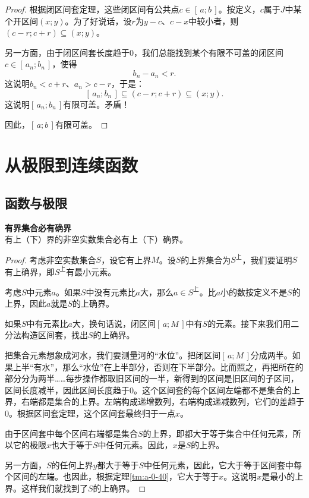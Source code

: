 \documentclass[12pt,UTF8]{ctexbook}
\begin{document}
\begin{appendix}
\begin{proof}
    根据闭区间套定理，这些闭区间有公共点$c\in[\,a; b\,]$。按定义，$c$属于$J$中某个开区间$(x; y)$。为了好说话，设$r$为$y-c$、$c-x$中较小者，则$(c-r; c+r)\subseteq (x; y)$。

    另一方面，由于闭区间套长度趋于$0$，我们总能找到某个有限不可盖的闭区间$c\in [\,a_n; b_n\,]$，使得
    $$ b_n - a_n < r.$$
    这说明$b_n < c+r$、$a_n>c-r$，于是：
    $$[\,a_n; b_n\,] \subseteq (c-r; c+r) \subseteq (x; y). $$
    这说明$[\,a_n; b_n\,]$有限可盖。矛盾！

    因此，$[\,a; b\,]$有限可盖。

\end{proof}

\chapter{从极限到连续函数}
\section{函数与极限}
\begin{tm}{\textbf{有界集合必有确界}}\label{tm:b-0-0}\\
    有上（下）界的非空实数集合必有上（下）确界。
\end{tm}
\begin{proof}
    考虑非空实数集合$S$，设它有上界$M$。设$S$的上界集合为$S^{\text{上}}$，我们要证明$S$有上确界，即$S^{\text{上}}$有最小元素。

    考虑$S$中元素$a$。如果$S$中没有元素比$a$大，那么$a\in S^{\text{上}}$。比$a$小的数按定义不是$S$的上界，因此$a$就是$S$的上确界。

    如果$S$中有元素比$a$大，换句话说，闭区间$[\,a; M\,]$中有$S$的元素。接下来我们用二分法构造区间套，找出$S$的上确界。

    把集合元素想象成河水，我们要测量河的“水位”。把闭区间$[\,a; M\,]$分成两半。如果上半“有水”，那么“水位”在上半部分，否则在下半部分。比而照之，再把所在的部分分为两半……每步操作都取旧区间的一半，新得到的区间是旧区间的子区间，区间长度减半，因此区间长度趋于$0$。这个区间套的每个区间左端都不是集合的上界，右端都是集合的上界。左端构成递增数列，右端构成递减数列，它们的差趋于$0$。根据区间套定理，这个区间套最终归于一点$x$。

    由于区间套中每个区间右端都是集合$S$的上界，即都大于等于集合中任何元素，所以它的极限$x$也大于等于$S$中任何元素。因此，$x$是$S$的上界。
    
    另一方面，$S$的任何上界$y$都大于等于$S$中任何元素，因此，它大于等于区间套中每个区间的左端。也因此，根据定理\ref{tm:a-0-40}，它大于等于$x$。这说明$x$是最小的上界。这样我们就找到了$S$的上确界。


\end{proof}
\end{appendix}
\end{document}
